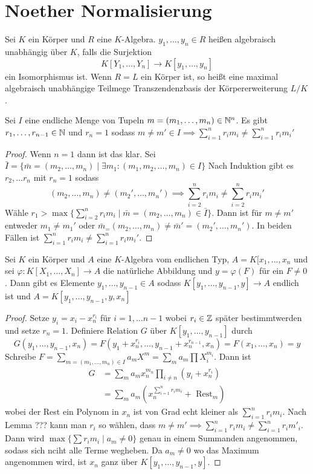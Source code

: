 \section{Noether Normalisierung}
\begin{Def}
	Sei \(K\) ein Körper und \(R\) eine \(K\)-Algebra. \(y_1,\dots,y_n\in R\) heißen algebraisch unabhängig über \(K\), falls die Surjektion \[K[Y_1,\dots,Y_n]\to K[y_1,\dots,y_n]\] ein Isomorphismus ist.
	Wenn \(R=L\) ein Körper ist, so heißt eine maximal algebraisch unabhängige Teilmege Transzendenzbasis der Körpererweiterung \(L/K\).
\end{Def}
\begin{Lemma}
	Sei \(I\) eine endliche Menge von Tupeln \(m=(m_1,\dots,m_n)\in \mathbb{N}^n\).
	Es gibt \(r_1,\dots,r_{n-1}\in\mathbb{N}\) und \(r_n=1\) sodass 
	\(m\neq m'\in I\implies \sum_{i=1}^nr_im_i\neq \sum_{i=1}^nr_im_i'\)
\end{Lemma}
\begin{proof}
	Wenn \(n=1\) dann ist das klar.
	Sei \(\bar I=\{\bar m=(m_2,\dots,m_n)\mid \exists m_1\colon (m_1,m_2,\dots,m_n)\in I\}\)
	Nach Induktion gibt es \(r_2,\dots r_n\) mit \(r_n=1\) sodass \[(m_2,\dots,m_n)\neq (m_2',\dots,m_n')\implies \sum_{i=2}^nr_im_i\neq \sum_{i=2}^nr_im_i'\]
	Wähle \(r_1>\max\{\sum_{i=2}^nr_im_i\mid \bar m=(m_2,\dots,m_n)\in \bar I\}\).
	Dann ist für \(m\neq m'\) entweder \(m_1\neq m_1'\) oder \(\bar m_=(m_2,\dots,m_n)\neq \bar m'=(m_2',\dots,m_n')\).
	In beiden Fällen ist \(\sum_{i=1}^nr_im_i\neq \sum_{i=1}^nr_i m_i'\).
\end{proof}
\begin{Lemma}
	Sei \( K \) ein Körper und \( A \) eine \( K \)-Algebra vom endlichen Typ, \( A=K[x_1,\dots,x_n\) und sei 
	\( \varphi \colon K[X_1,\dots,X_n]\to A \) die natürliche Abbildung und \( y = \varphi (F) \) für ein \( F\neq 0\).
	Dann gibt es Elemente \( y_1 , \dots , y_{n-1} \in A \) sodass \( K[y_1,\dots,y_{n-1},y]\to A \) endlich ist und 
	\( A=K[y_1,\dots,y_{n-1},y,x_n]\)
\end{Lemma}
\begin{proof}
	Setze \( y_i = x_i - x_n^{r_i} \) für \( i=1,\dots n-1\) wobei \( r_i \in \mathbb{Z} \) später bestimmtwerden und setze \(r_n=1\).
	Definiere Relation \( G \) über \( K[y_1,\dots,y_{n-1}] \) durch 
	\[ G(y_1,\dots,y_{n-1},x_n) = F(y_1+x_n^{r_i},\dots,y_{n-1}+x_n^{r_{n-1}},x_n)=F(x_1,\dots,x_n)=y \]
	Schreibe \( F = \sum\limits_{m=(m_1,\dots,m_n)\in I } a_m X^m = \sum_m a_m \prod X_i^{m_i} \). Dann ist 
	\begin{align*}
		G &= \sum_m a_mx_n^{m_n}\prod_{i\neq n } (y_i +x_n^{r_i} )\\
		& = \sum_m a_m(x_n^{\sum_{i=1}^nr_im_i} + \text{ Rest}_m)
	\end{align*}
	wobei der Rest ein Polynom in \( x_n \) ist von Grad  echt kleiner als \(\sum_{i=1}^nr_im_i\). Nach Lemma ??? kann man \( r_i\) so wählen,
	dass \(m\neq m' \implies \sum_{i=1}^nr_im_i\neq \sum_{i=1}^nr_im'_i \). Dann wird \( \max\{\sum r_im_i\mid a_m \neq 0\} \) genau in einem 
	Summanden angenommen, sodass sich nciht alle Terme wegheben. Da \(  a_m\neq 0 \) wo das Maximum angenommen wird, ist \( x_n\) ganz über 
	\(K[y_1,\dots,y_{n-1},y]\).
\end{proof}
